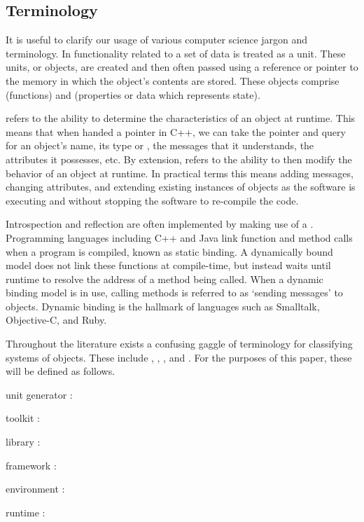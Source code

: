 \documentclass[twoside,10pt]{article}
\newenvironment{packed_item}{
\begin{itemize}
  \setlength{\itemsep}{1pt}
  \setlength{\parskip}{0pt}
  \setlength{\parsep}{0pt}
}{\end{itemize}}
\begin{document}
\subsection{Terminology}

It is useful to clarify our usage of various computer science jargon and terminology.  In  functionality related to a set of data is treated as a unit.  These units, or objects, are created and then often passed using a reference or pointer to the memory in which the object's contents are stored.  These objects comprise  (functions) and  (properties or data which represents state).

 refers to the ability to determine the characteristics of an object at runtime.  This means that when handed a pointer in C++, we can take the pointer and query for an object's name, its type or , the messages that it understands, the attributes it possesses, etc.  By extension,  refers to the ability to then modify the behavior of an object at runtime.  In practical terms this means adding messages, changing attributes, and extending existing instances of objects as the software is executing and without stopping the software to re-compile the code.

Introspection and reflection are often implemented by making use of a .  Programming languages including C++ and Java link function and method calls when a program is compiled, known as static binding.  A dynamically bound model does not link these functions at compile-time, but instead waits until runtime to resolve the address of a method being called.  When a dynamic binding model is in use, calling methods is referred to as `sending messages' to objects.  Dynamic binding is the hallmark of languages such as Smalltalk, Objective-C, and Ruby.

Throughout the literature exists a confusing gaggle of terminology for classifying systems of objects.  These include , , , and .  For the purposes of this paper, these will be defined as follows.  

\begin{packed_item}%
	\item unit generator :
	\item toolkit	:
	\item library :
	\item framework :
	\item environment :
	\item runtime :
\end{packed_item}%
\end{document}
